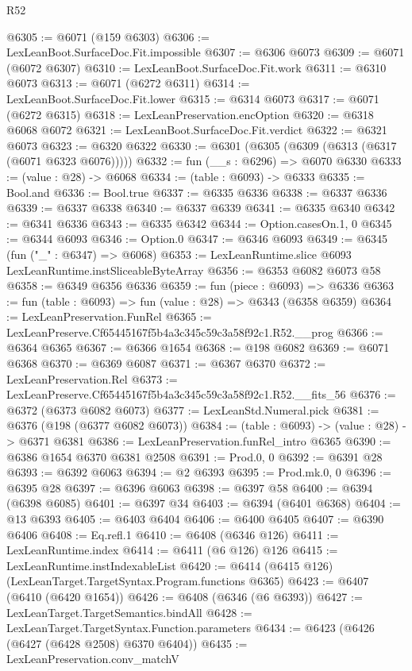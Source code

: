 \begin{lexlean}{R52}
\begin{coremodule}
@6305 := @6071 (@159 @6303)
@6306 := LexLeanBoot.SurfaceDoc.Fit.impossible
@6307 := @6306 @6073
@6309 := @6071 (@6072 @6307)
@6310 := LexLeanBoot.SurfaceDoc.Fit.work
@6311 := @6310 @6073
@6313 := @6071 (@6272 @6311)
@6314 := LexLeanBoot.SurfaceDoc.Fit.lower
@6315 := @6314 @6073
@6317 := @6071 (@6272 @6315)
@6318 := LexLeanPreservation.encOption
@6320 := @6318 @6068 @6072
@6321 := LexLeanBoot.SurfaceDoc.Fit.verdict
@6322 := @6321 @6073
@6323 := @6320 @6322
@6330 := @6301 (@6305 (@6309 (@6313 (@6317 (@6071 @6323 @6076)))))
@6332 := fun (__s : @6296) => @6070 @6330
@6333 := (value : @28) -> @6068
@6334 := (table : @6093) -> @6333
@6335 := Bool.and
@6336 := Bool.true
@6337 := @6335 @6336
@6338 := @6337 @6336
@6339 := @6337 @6338
@6340 := @6337 @6339
@6341 := @6335 @6340
@6342 := @6341 @6336
@6343 := @6335 @6342
@6344 := Option.casesOn.{1, 0}
@6345 := @6344 @6093
@6346 := Option.{0}
@6347 := @6346 @6093
@6349 := @6345 (fun ("_" : @6347) => @6068)
@6353 := LexLeanRuntime.slice @6093 LexLeanRuntime.instSliceableByteArray
@6356 := @6353 @6082 @6073 @58
@6358 := @6349 @6356 @6336
@6359 := fun (piece : @6093) => @6336
@6363 := fun (table : @6093) => fun (value : @28) => @6343 (@6358 @6359)
@6364 := LexLeanPreservation.FunRel
@6365 := LexLeanPreserve.Cf65445167f5b4a3c345c59c3a58f92c1.R52.__prog
@6366 := @6364 @6365
@6367 := @6366 @1654
@6368 := @198 @6082
@6369 := @6071 @6368
@6370 := @6369 @6087
@6371 := @6367 @6370
@6372 := LexLeanPreservation.Rel
@6373 := LexLeanPreserve.Cf65445167f5b4a3c345c59c3a58f92c1.R52.__fits_56
@6376 := @6372 (@6373 @6082 @6073)
@6377 := LexLeanStd.Numeral.pick
@6381 := @6376 (@198 (@6377 @6082 @6073))
@6384 := (table : @6093) -> (value : @28) -> @6371 @6381
@6386 := LexLeanPreservation.funRel_intro @6365
@6390 := @6386 @1654 @6370 @6381 @2508
@6391 := Prod.{0, 0}
@6392 := @6391 @28
@6393 := @6392 @6063
@6394 := @2 @6393
@6395 := Prod.mk.{0, 0}
@6396 := @6395 @28
@6397 := @6396 @6063
@6398 := @6397 @58
@6400 := @6394 (@6398 @6085)
@6401 := @6397 @34
@6403 := @6394 (@6401 @6368)
@6404 := @13 @6393
@6405 := @6403 @6404
@6406 := @6400 @6405
@6407 := @6390 @6406
@6408 := Eq.refl.{1}
@6410 := @6408 (@6346 @126)
@6411 := LexLeanRuntime.index
@6414 := @6411 (@6 @126) @126
@6415 := LexLeanRuntime.instIndexableList
@6420 := @6414 (@6415 @126) (LexLeanTarget.TargetSyntax.Program.functions @6365)
@6423 := @6407 (@6410 (@6420 @1654))
@6426 := @6408 (@6346 (@6 @6393))
@6427 := LexLeanTarget.TargetSemantics.bindAll
@6428 := LexLeanTarget.TargetSyntax.Function.parameters
@6434 := @6423 (@6426 (@6427 (@6428 @2508) @6370 @6404))
@6435 := LexLeanPreservation.conv_matchV

\end{coremodule}
\end{lexlean}
